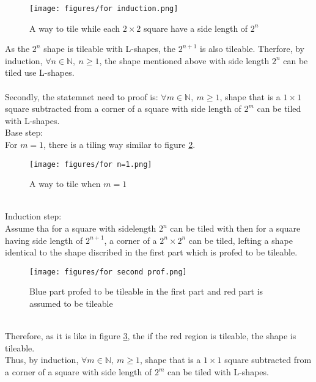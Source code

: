 \documentclass{article}
\begin{document}
        \begin{figure}[h]
            \centering
            \texttt{[image: figures/for induction.png]}
            \caption{A way to tile while each \(2\times2\) square have a side length of \(2^n\)}
            \label{n=n}
        \end{figure}\newpage
        As the \(2^n\) shape is tileable with L-shapes, the \(2^{n+1}\) is also tileable. Therfore, by induction, \(\forall n\in \mathbb{N},\ n\geqslant 1\),
        the shape mentioned above with side length \(2^n\) can be tiled use L-shapes.
        \\ \\
        Secondly, the statemnet need to proof is: \(\forall m\in\mathbb{N},\ m\geqslant 1\), shape that is a \(1\times 1\) square subtracted from a corner of a square with side length of \(2^m\) can be tiled with L-shapes.\\
        Base step:\\
        For \(m=1\), there is a tiling way similar to figure \ref{m=1}.
        \begin{figure}[h]
            \centering
            \texttt{[image: figures/for n=1.png]}
            \caption{A way to tile when \(m=1\)}
            \label{m=1}
        \end{figure}\\
        Induction step:\\
        Assume tha for a square with sidelength \(2^n\) can be tiled with then for a square having side length of \(2^{n+1}\), a corner of a \(2^n\times 2^n\) can be tiled,
        lefting a shape identical to the shape discribed in the first part which is profed to be tileable. 
        \begin{figure}[h]
            \centering
            \texttt{[image: figures/for second prof.png]}
            \caption{Blue part profed to be tileable in the first part and red part is assumed to be tileable}
            \label{p2}
        \end{figure}\\
        Therefore, as it is like in figure \ref{p2}, the if the red region is 
        tileable, the shape is tileable.\\
        Thus, by induction, \(\forall m\in\mathbb{N},\ m\geqslant 1\), shape that is a \(1\times 1\) square subtracted from a corner of a square with side length of \(2^m\) can be tiled with L-shapes.
\end{document}
